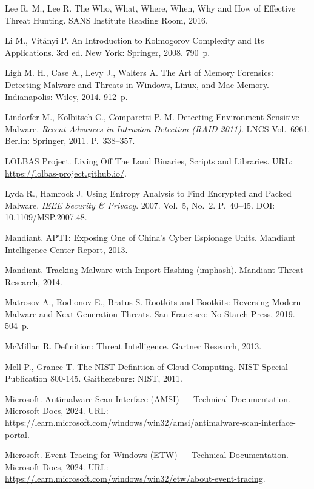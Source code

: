  Lee R. M., Lee R. The Who, What, Where, When, Why and How of Effective Threat Hunting. SANS Institute Reading Room, 2016.

 Li M., Vitányi P. An Introduction to Kolmogorov Complexity and Its Applications. 3rd ed. New York: Springer, 2008. 790~p.

 Ligh M. H., Case A., Levy J., Walters A. The Art of Memory Forensics: Detecting Malware and Threats in Windows, Linux, and Mac Memory. Indianapolis: Wiley, 2014. 912~p.

 Lindorfer M., Kolbitsch C., Comparetti P. M. Detecting Environment-Sensitive Malware. \emph{Recent Advances in Intrusion Detection (RAID 2011)}. LNCS Vol.~6961. Berlin: Springer, 2011. P.~338--357.

 LOLBAS Project. Living Off The Land Binaries, Scripts and Libraries. URL: \url{https://lolbas-project.github.io/}.

 Lyda R., Hamrock J. Using Entropy Analysis to Find Encrypted and Packed Malware. \emph{IEEE Security \& Privacy}. 2007. Vol.~5, No.~2. P.~40--45. DOI: 10.1109/MSP.2007.48.

 Mandiant. APT1: Exposing One of China's Cyber Espionage Units. Mandiant Intelligence Center Report, 2013.

 Mandiant. Tracking Malware with Import Hashing (imphash). Mandiant Threat Research, 2014.

 Matrosov A., Rodionov E., Bratus S. Rootkits and Bootkits: Reversing Modern Malware and Next Generation Threats. San Francisco: No Starch Press, 2019. 504~p.

 McMillan R. Definition: Threat Intelligence. Gartner Research, 2013.

 Mell P., Grance T. The NIST Definition of Cloud Computing. NIST Special Publication 800-145. Gaithersburg: NIST, 2011.

 Microsoft. Antimalware Scan Interface (AMSI) --- Technical Documentation. Microsoft Docs, 2024. URL: \url{https://learn.microsoft.com/windows/win32/amsi/antimalware-scan-interface-portal}.

 Microsoft. Event Tracing for Windows (ETW) --- Technical Documentation. Microsoft Docs, 2024. URL: \url{https://learn.microsoft.com/windows/win32/etw/about-event-tracing}.

